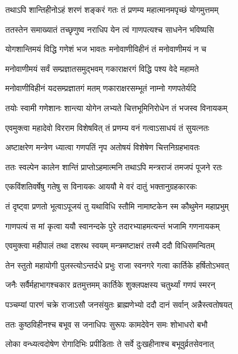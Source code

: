 \twolineshloka
{तथाऽपि शान्तिहीनोऽहं शरणं शङ्करं गतः}
{तं प्रणम्य महात्मानमपृच्छं योगमुत्तमम्} %

\twolineshloka
{ततस्तेन समाख्यातं तच्छृणुष्व नराधिप}
{येन त्वं गाणपत्यश्च साधनेन भविष्यसि} %


\twolineshloka
{योगशान्तिमयं विद्धि गणेशं भज भावतः}
{मनोवाणीविहीनं तं मनोवाणीमयं न च} %

\twolineshloka
{मनोवाणीमयं सर्वं सम्प्रज्ञातसमुद्भवम्}
{गकाराक्षरगं विद्धि पश्य वेदे महामते} %

\twolineshloka
{मनोवाणीविहीनं यदसम्प्रज्ञातगं मतम्}
{णकाराक्षरसम्भूतं नाम्नो गणपतेर्यदि} %

\twolineshloka
{तयोः स्वामी गणेशानः शान्त्या योगेन लभ्यते}
{चित्तभूमिनिरोधेन तं भजस्व विनायकम्} %

\twolineshloka
{एवमुक्त्वा महादेवो विरराम विशेषवित्}
{तं प्रणम्य वनं गत्वाऽसाधयं तं सुयत्नतः} %

\twolineshloka
{अष्टाक्षरेण मन्त्रेण ध्यात्वा गणपतिं नृप}
{अतोषयं विशेषेण चित्तनिग्रहभावतः} %

\twolineshloka
{ततः स्वल्पेन कालेन शान्तिं प्राप्तोऽहमात्मनि}
{तथाऽपि मन्त्रराजं तमजपं पूजने रतः} %

\twolineshloka
{एकविंशतिवर्षेषु गतेषु स विनायकः}
{आययौ मे वरं दातुं भक्तानुग्रहकारकः} %

\twolineshloka
{तं दृष्ट्वा प्रणतो भूत्वाऽपूजयं तु यथाविधि}
{स्तौमि नामाष्टकेन स्म कौथुमेन महाप्रभुम्} %

\twolineshloka
{गाणपत्यं स मां कृत्वा ययौ स्वानन्दके पुरे}
{तदारभ्याहमत्यन्तं भजामि गणनायकम्} %

\twolineshloka
{एवमुक्त्वा महीपालं तथा दशरथ स्वयम्}
{मन्त्रमष्टाक्षरं तस्मै ददौ विधिसमन्वितम्} %

\twolineshloka
{तेन स्तुतो महायोगी पुलस्त्योऽन्तर्दधे प्रभुः}
{राजा स्वनगरे गत्वा कार्तिके हर्षितोऽभवत्} %

\twolineshloka
{जनैः सर्वैर्महाभागश्चकार व्रतमुत्तमम्}
{कार्तिके शुक्लपक्षस्य चतुर्थ्यां गणपं स्मरन्} %

\twolineshloka
{पञ्चम्यां पारणं चक्रे राजाऽसौ जनसंयुतः}
{ब्राह्मणेभ्यो ददौ दानं सर्वान् अन्नैस्त्वतोषयत्} %

\twolineshloka
{ततः कुष्ठविहीनश्च बभूव स जनाधिपः}
{सुरूपः कामदेवेन समः शोभाधरो बभौ} %

\twolineshloka
{लोका वन्ध्यत्वदोषेण रोगादिभिः प्रपीडिताः}
{ते सर्वे दुःखहीनाश्च बभूवुर्व्रतसेवनात्} %

